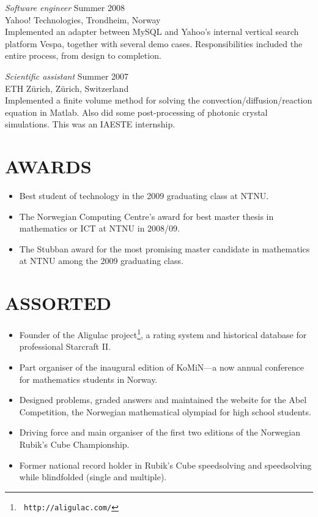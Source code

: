 \documentclass[line,margin]{res}
\newcommand{\zh}{Z\"{u}rich}
\begin{document}
\begin{resume}
    {\em Software engineer} \hfill Summer 2008 \\
    Yahoo! Technologies, Trondheim, Norway \\
    Implemented an adapter between MySQL and Yahoo's internal vertical search
    platform Vespa, together with several demo cases. Responsibilities included
    the entire process, from design to completion.

    {\em Scientific assistant} \hfill Summer 2007 \\
    ETH \zh, \zh, Switzerland \\
    Implemented a finite volume method for solving the
    convection/diffusion/reaction equation in Matlab. Also did some
    post-processing of photonic crystal simulations. This was an IAESTE
    internship.


\section{AWARDS}
    \begin{itemize}
        \item Best student of technology in the 2009 graduating class at NTNU.
        \item The Norwegian Computing Centre's award for best master thesis in
            mathematics or ICT at NTNU in 2008/09.
        \item The Stubban award for the most promising master candidate in
            mathematics at NTNU among the 2009 graduating class.
    \end{itemize}


\newpage


\section{ASSORTED}
    \begin{itemize}
        \item Founder of the Aligulac project\footnote{{\tt
            http://aligulac.com/}}, a rating system and historical database for
            professional Starcraft II.
        \item Part organiser of the inaugural edition of KoMiN---a now annual
            conference for mathematics students in Norway.
        \item Designed problems, graded answers and maintained the website for
            the Abel Competition, the Norwegian mathematical olympiad for high
            school students.
        \item Driving force and main organiser of the first two editions of the
            Norwegian Rubik's Cube Championship.
        \item Former national record holder in Rubik's Cube speedsolving and
            speedsolving while blindfolded (single and multiple).
    \end{itemize}



\end{resume}
\end{document}

